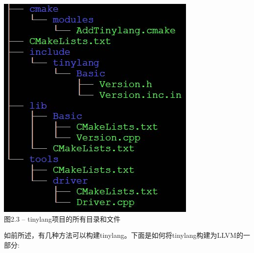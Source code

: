\hspace*{\fill} \par %
\begin{center}
\includegraphics{content/1/chapter2/images/3.jpg}\\
图2.3 – tinylang项目的所有目录和文件
\end{center}

如前所述，有几种方法可以构建tinylang。下面是如何将tinylang构建为LLVM的一部分:\par

